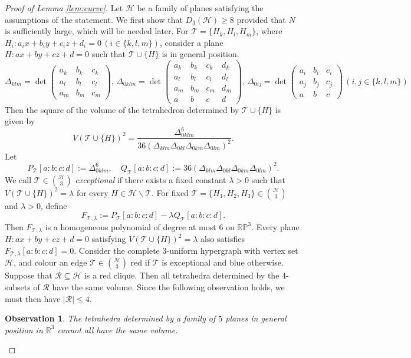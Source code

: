 \documentclass[a4paper,oneside,10pt]{amsart}
\newtheorem{obs}{Observation}
\begin{document}
\begin{proof}[Proof of Lemma \ref{lem:curve}]
Let $\mathcal{H}$ be a family of planes satisfying the assumptions of the statement.
We first show that $D_3(\mathcal{H}) \geq 8$ provided that $N$ is sufficiently large, which will be needed later.
For $\mathcal{T} = \{ H_k, H_l, H_m \}$, where $H_i: a_i x + b_i y + c_i z + d_i = 0 \, (i \in \{ k, l, m \})$, consider a plane $H: ax + by +cz + d = 0$ such that $\mathcal{T} \cup \{ H \}$ is in general position.
$$
\Delta_{klm}=
\det\!\begin{pmatrix}
a_k & b_k & c_k \\
a_l & b_l & c_l \\
a_m & b_m & c_m
\end{pmatrix},
\,
\Delta_{0klm}=
\det\!\begin{pmatrix}
a_k & b_k & c_k & d_k \\
a_l & b_l & c_l & d_l \\
a_m & b_m & c_m & d_m \\
a & b & c & d
\end{pmatrix},
\,
\Delta_{0ij}=
\det\!\begin{pmatrix}
a_i & b_i & c_i \\
a_j & b_j & c_j \\
a & b & c
\end{pmatrix}
\, (i, j \in \{ k, l, m \})
$$
Then the square of the volume of the tetrahedron determined by $\mathcal{T} \cup \{ H \}$ is given by
$$
V(\mathcal{T} \cup \{ H \})^2 = \frac{\Delta_{0klm}^6}{36 (\Delta_{klm} \Delta_{0kl} \Delta_{0km} \Delta_{0lm})^2}.
$$
Let
$$
P_\mathcal{T} [a:b:c:d] := \Delta_{0klm}^6, \quad Q_\mathcal{T} [a:b:c:d] := 36 (\Delta_{klm} \Delta_{0kl} \Delta_{0km} \Delta_{0lm})^2.
$$
We call $\mathcal{T} \in \binom{\mathcal{H}}{3}$ \textit{exceptional} if there exists a fixed constant $\lambda > 0$ such that
$V(\mathcal{T} \cup \{H \})^2 = \lambda$
for every $H \in \mathcal{H} \backslash \mathcal{T}$.
For fixed $\mathcal{T} = \{ H_1, H_2, H_3 \} \in \binom{\mathcal{H}}{3}$ and $\lambda > 0$, define
$$
F_{\mathcal{T}, \lambda} := P_\mathcal{T} [a:b:c:d] - \lambda Q_\mathcal{T} [a:b:c:d].
$$
Then $F_{\mathcal{T}, \lambda}$ is a homogeneous polynomial of degree at most $6$ on $\mathbb{RP}^3$.
Every plane $H: ax + by +cz + d = 0$ satisfying
$V(\mathcal{T} \cup \{ H \})^2 = \lambda$
also satisfies $F_{\mathcal{T}, \lambda} [a:b:c:d] = 0$.
Consider the complete $3$-uniform hypergraph with vertex set $\mathcal{H}$, and colour an edge $\mathcal{T} \in \binom{\mathcal{H}}{3}$ red if $\mathcal{T}$ is exceptional and blue otherwise.
Suppose that $\mathcal{R} \subseteq \mathcal{H}$ is a red clique. Then all tetrahedra determined by the $4$-subsets of $\mathcal{R}$ have the same volume.
Since the following observation holds, we must then have $|\mathcal{R}| \leq 4$.
\begin{obs} \label{lem:redclique}
The tetrahedra determined by a family of $5$ planes in general position in $\mathbb{R}^3$ cannot all have the same volume.
\end{obs}


\end{proof}
\end{document}
